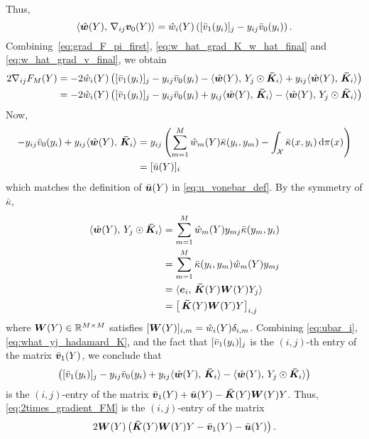 Thus,
\begin{equation}\label{eq:w_hat_grad_v_final}
    \langle\hat{\bm{w}}(Y),\,\nabla_{ij} \bm{v}_0(Y)\rangle = \hat{w}_{i}(Y)\left( [\bar{v}_{1}(y_{i})]_{j}  - y_{ij}\bar{v}_{0}(y_{i})\right).
\end{equation}
Combining~\eqref{eq:grad_F_pi_first}, \eqref{eq:w_hat_grad_K_w_hat_final} and \eqref{eq:w_hat_grad_v_final}, we obtain 
\begin{align}\label{eq:2times_gradient_FM}
    2\nabla_{ij} F_{M}(Y) &= -2\hat{w}_{i}(Y)\left([\bar{v}_{1}(y_{i})]_{j}  - y_{ij}\bar{v}_{0}(y_{i})- \langle\hat{\bm{w}}(Y),\, Y_{j}\odot\bm{\bar{K}}_i\rangle + y_{ij}\langle\hat{\bm{w}}(Y),\,\bm{\bar{K}}_i\rangle
    \right) \nonumber \\
    &= -2\hat{w}_{i}(Y)\left( [\bar{v}_{1}(y_{i})]_{j} - y_{ij} \bar{v}_{0}(y_{i}) + y_{ij} \langle\hat{\bm{w}}(Y),\,\bm{\bar{K}}_i\rangle - \langle\hat{\bm{w}}(Y),\,Y_{j}\odot\bm{\bar{K}}_i\rangle 
    \right)
\end{align}
Now, 
\begin{align}\label{eq:ubar_i}
   - y_{ij} \bar{v}_{0}(y_{i}) + y_{ij} \langle\hat{\bm{w}}(Y),\,\bm{\bar{K}}_i\rangle &= y_{ij} \left( \sum\limits_{m=1}^{M}\hat{w}_{m}(Y)\bar{\kappa}(y_{i},y_{m}) - \int_{\mathcal{X}} \bar{\kappa}(x,y_{i}) \,\mathrm{d}\pi(x) \right)\nonumber\\
   &= [\bar{u}(Y)]_{i} 
\end{align}
which matches the definition of $\bar{\bm{u}}(Y)$ in \cref{eq:u_vonebar_def}. By the symmetry of $\bar\kappa$,%
\begin{align}\label{eq:what_yj_hadamard_K}
    \langle\hat{\bm{w}}(Y),\, Y_{j}\odot \bm{\bar{K}}_i\rangle &= \sum_{m=1}^M \hat{w}_{m}(Y)y_{mj}\bar{\kappa}(y_{m},y_{i}) \nonumber\\
    &= \sum_{m=1}^M \bar{\kappa}(y_{i},y_{m})\hat{w}_{m}(Y)y_{mj} \nonumber\\
    &= \langle\bm{e}_i,\, \bm{\bar{K}}(Y)\bm{W}(Y)Y_j\rangle \nonumber\\
    &= \left[\,\bm{\bar{K}}(Y)\bm{W}(Y)Y\right]_{i,j}
\end{align}
where $\bm{W}(Y)\in\mathbb{R}^{M\times M}$ satisfies $[\bm{W}(Y)]_{i,m} = \hat{w}_{i}(Y)\delta_{i,m}$.  Combining \eqref{eq:ubar_i}, \eqref{eq:what_yj_hadamard_K}, and the fact that $[\bar{v}_{1}(y_{i})]_j$ is the $(i,j)$-th entry of the matrix $\bar{\bm{v}}_{1}(Y)$, we conclude that
\begin{equation*}
    \left([\bar{v}_{1}(y_{i})]_{j} - y_{ij}\bar{v}_{0}(y_{i}) + y_{ij} \langle\hat{\bm{w}}(Y),\, \bm{\bar{K}}_i\rangle - \langle\hat{\bm{w}}(Y),\, Y_{j}\odot \bm{\bar{K}}_i\rangle 
    \right)
\end{equation*}
is the $(i,j)$-entry of the matrix $\bar{\bm{v}}_{1}(Y) + \bar{\bm{u}}(Y) -\bm{\bar{K}}(Y) \bm{W}(Y) Y$. Thus, \eqref{eq:2times_gradient_FM} is
the $(i,j)$-entry of the matrix 
\begin{equation}
    2 \bm{W}(Y) \left( \bm{\bar{K}}(Y) \bm{W}(Y) Y  - \bar{\bm{v}}_{1}(Y) - \bar{\bm{u}}(Y)\right).
\end{equation}
